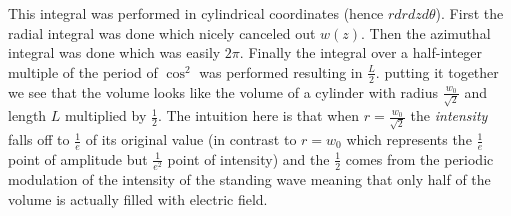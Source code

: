 \documentclass[12pt]{article}
\begin{document}
This integral was performed in cylindrical coordinates (hence $rdr dz d\theta$). First the radial integral was done which nicely canceled out $w(z)$. Then the azimuthal integral was done which was easily $2\pi$. Finally the integral over a half-integer multiple of the period of $\cos^2$ was performed resulting in $\frac{L}{2}$. putting it together we see that the volume looks like the volume of a cylinder with radius $\frac{w_0}{\sqrt{2}}$ and length $L$ multiplied by $\frac{1}{2}$. The intuition here is that when $r=\frac{w_0}{\sqrt{2}}$ the \textit{intensity} falls off to $\frac{1}{e}$ of its original value (in contrast to $r=w_0$ which represents the $\frac{1}{e}$ point of amplitude but $\frac{1}{e^2}$ point of intensity) and the $\frac{1}{2}$ comes from the periodic modulation of the intensity of the standing wave meaning that only half of the volume is actually filled with electric field.

\printbibliography
\end{document}
